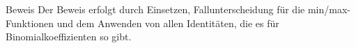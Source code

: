 \begin{frame}{Beweis}
    Der Beweis erfolgt durch Einsetzen, Fallunterscheidung für die min/max-Funktionen und dem Anwenden von allen Identitäten, die es für Binomialkoeffizienten so gibt.
\end{frame}